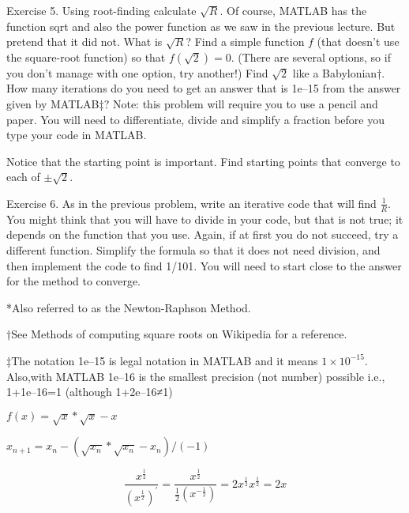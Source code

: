 \documentclass[a4paper,12pt]{article}
\begin{document}
Exercise 5. Using root-finding calculate \(\sqrt{R}\). Of course, MATLAB has the function sqrt and also the power function as we saw in the previous lecture. But pretend that it did not. What is \(\sqrt{R}\)? Find a simple function \(f\) (that doesn't use the square-root function) so that \(f(\sqrt{2})=0\). (There are several options, so if you don't manage with one option, try another!) Find \(\sqrt{2}\) like a Babylonian†. How many iterations do you need to get an answer that is 1e–15 from the answer given by MATLAB‡? Note: this problem will require you to use a pencil and paper. You will need to differentiate, divide and simplify a fraction before you type your code in MATLAB.

Notice that the starting point is important. Find starting points that converge to each of \(\pm\sqrt{2}\).

Exercise 6. As in the previous problem, write an iterative code that will find \(\frac{1}{R}\). You might think that you will have to divide in your code, but that is not true; it depends on the function that you use. Again, if at first you do not succeed, try a different function. Simplify the formula so that it does not need division, and then implement the code to find 1/101. You will need to start close to the answer for the method to converge.

*Also referred to as the Newton-Raphson Method.

†See Methods of computing square roots on Wikipedia for a reference.

‡The notation 1e–15 is legal notation in MATLAB and it means \(1\times10^{-15}\). Also,with MATLAB 1e–16 is the smallest precision (not number) possible i.e., 1+1e–16=1 (although 1+2e–16≠1)


\(f(x)=\sqrt{x}*\sqrt{x} - x\)

\(x_{n+1} = x_{n} - (\sqrt{x_{n}}*\sqrt{x_{n}} - x_{n})/(- 1)\)



\[\frac{{{x^{\frac{1}{2}}}}}{{{{\left( {{x^{\frac{1}{2}}}} \right)}^\prime }}} = \frac{{{x^{\frac{1}{2}}}}}{{\frac{1}{2}\left( {{x^{ - \frac{1}{2}}}} \right)}} = 2{x^{\frac{1}{2}}}{x^{\frac{1}{2}}} = 2x\]
\end{document}
